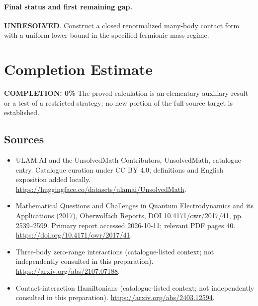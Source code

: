 \documentclass[11pt]{article}
\begin{document}
\paragraph{Final status and first remaining gap.}
\textbf{UNRESOLVED}. Construct a closed renormalized many-body contact form with a uniform lower bound in the specified fermionic mass regime.

\section{Completion Estimate}
\noindent\textbf{COMPLETION: 0\%}
The proved calculation is an elementary auxiliary result or a test of a restricted strategy; no new portion of the full source target is established.

\subsection{Sources}
\begin{itemize}
\item[\hypertarget{source:statement:1}{S1}] ULAM.AI and the UnsolvedMath Contributors, UnsolvedMath, catalogue entry. Catalogue curation under CC BY 4.0; definitions and English exposition added locally.
\url{https://huggingface.co/datasets/ulamai/UnsolvedMath}.
\item[\hypertarget{source:statement:2}{S2}] Mathematical Questions and Challenges in Quantum Electrodynamics and its Applications (2017), Oberwolfach Reports, DOI 10.4171/owr/2017/41, pp. 2539--2599. Primary report accessed 2026-10-11; relevant PDF pages 40.
\url{https://doi.org/10.4171/owr/2017/41}.
\item[\hypertarget{source:statement:3}{S3}] Three-body zero-range interactions (catalogue-listed context; not independently consulted in this preparation).
\url{https://arxiv.org/abs/2107.07188}.
\item[\hypertarget{source:statement:4}{S4}] Contact-interaction Hamiltonians (catalogue-listed context; not independently consulted in this preparation).
\url{https://arxiv.org/abs/2403.12594}.
\end{itemize}
\label{end:statement}
\end{document}
